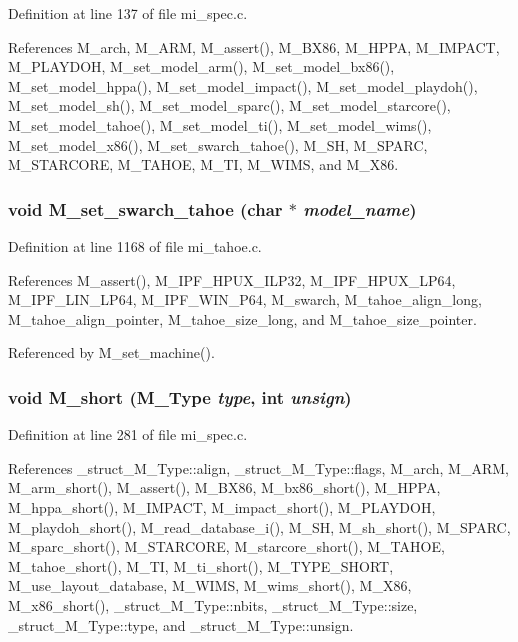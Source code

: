 Definition at line 137 of file mi\_\-spec.c.

References M\_\-arch, M\_\-ARM, M\_\-assert(), M\_\-BX86, M\_\-HPPA, M\_\-IMPACT, M\_\-PLAYDOH, M\_\-set\_\-model\_\-arm(), M\_\-set\_\-model\_\-bx86(), M\_\-set\_\-model\_\-hppa(), M\_\-set\_\-model\_\-impact(), M\_\-set\_\-model\_\-playdoh(), M\_\-set\_\-model\_\-sh(), M\_\-set\_\-model\_\-sparc(), M\_\-set\_\-model\_\-starcore(), M\_\-set\_\-model\_\-tahoe(), M\_\-set\_\-model\_\-ti(), M\_\-set\_\-model\_\-wims(), M\_\-set\_\-model\_\-x86(), M\_\-set\_\-swarch\_\-tahoe(), M\_\-SH, M\_\-SPARC, M\_\-STARCORE, M\_\-TAHOE, M\_\-TI, M\_\-WIMS, and M\_\-X86.
\subsubsection{\setlength{\rightskip}{0pt plus 5cm}void M\_\-set\_\-swarch\_\-tahoe (char $\ast$ {\em model\_\-name})}\label{m__spec_8h_61dc2747abad23fb15b2b4dfcc342b6d}




Definition at line 1168 of file mi\_\-tahoe.c.

References M\_\-assert(), M\_\-IPF\_\-HPUX\_\-ILP32, M\_\-IPF\_\-HPUX\_\-LP64, M\_\-IPF\_\-LIN\_\-LP64, M\_\-IPF\_\-WIN\_\-P64, M\_\-swarch, M\_\-tahoe\_\-align\_\-long, M\_\-tahoe\_\-align\_\-pointer, M\_\-tahoe\_\-size\_\-long, and M\_\-tahoe\_\-size\_\-pointer.

Referenced by M\_\-set\_\-machine().
\subsubsection{\setlength{\rightskip}{0pt plus 5cm}void M\_\-short (\bf{M\_\-Type} {\em type}, int {\em unsign})}\label{m__spec_8h_65c321d3074f61452f300327e7ddd8e7}




Definition at line 281 of file mi\_\-spec.c.

References \_\-struct\_\-M\_\-Type::align, \_\-struct\_\-M\_\-Type::flags, M\_\-arch, M\_\-ARM, M\_\-arm\_\-short(), M\_\-assert(), M\_\-BX86, M\_\-bx86\_\-short(), M\_\-HPPA, M\_\-hppa\_\-short(), M\_\-IMPACT, M\_\-impact\_\-short(), M\_\-PLAYDOH, M\_\-playdoh\_\-short(), M\_\-read\_\-database\_\-i(), M\_\-SH, M\_\-sh\_\-short(), M\_\-SPARC, M\_\-sparc\_\-short(), M\_\-STARCORE, M\_\-starcore\_\-short(), M\_\-TAHOE, M\_\-tahoe\_\-short(), M\_\-TI, M\_\-ti\_\-short(), M\_\-TYPE\_\-SHORT, M\_\-use\_\-layout\_\-database, M\_\-WIMS, M\_\-wims\_\-short(), M\_\-X86, M\_\-x86\_\-short(), \_\-struct\_\-M\_\-Type::nbits, \_\-struct\_\-M\_\-Type::size, \_\-struct\_\-M\_\-Type::type, and \_\-struct\_\-M\_\-Type::unsign.

